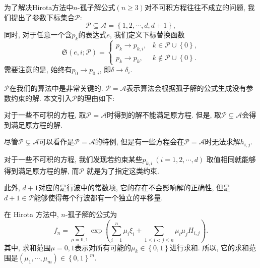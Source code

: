 \documentclass[12pt,a4paper,UTF8]{article}
\numberwithin{equation}{section}
\newcommand{\sbrace}[1]{\left(#1\right)}
\newcommand{\bbrace}[1]{\left\{#1\right\}}
\newcommand{\ALLP}{\mathcal{A}}
\newcommand{\PS}{\mathcal{P}}
\newcommand{\SP}{\mathfrak{S}} %
\begin{document}
为了解决Hirota方法中$n$-孤子解公式$(n\ge 3)$对不可积方程往往不成立的问题, 我们提出了参数下标集合$\PS$: 
\begin{equation}
\PS\subseteq \ALLP=\bbrace{1,2,\cdots,d,d+1} ,
\end{equation}
同时, 对于任意一个含$p_k$的表达式$e$, 我们定义下标替换函数
\begin{equation}
\SP\sbrace{e,i;\PS}=\left\{\begin{array}{ll}
  p_k \to p_{k,i}, & k \in \PS \cup \bbrace{0},\\ 
  p_k \to p_k , & k \not\in\PS \cup \bbrace{0}.
\end{array}\right.
\end{equation}
需要注意的是, 始终有$p_0\to p_{0,i}$, 即$\delta\to \delta_i$. 

$\PS$在我们的算法中是非常关键的. $\PS= \ALLP$表示算法会根据孤子解的公式生成没有参数约束的解. 本文引入$\PS$的理由如下: 
\begin{compactenum}[1. ]
\item 对于一些不可积的方程, 取$\PS= \ALLP$时得到的解不能满足原方程. 但是, 取$\PS\subsetneq  \ALLP$会得到满足原方程的解.
\item 尽管$\PS\subsetneq  \ALLP$可以看作是$\PS= \ALLP$的特例, 但是有一些方程会在$\PS= \ALLP$时无法求解$h_{i,j}$.
\item 对于一些不可积的方程, 我们发现若约束某些$p_{k,i}~(i=1,2,\cdots,d)$ 取值相同就能够得到满足原方程的解, 而$\PS$ 就是为了指定这类约束.
\end{compactenum}

此外, $d+1$对应的是行波中的常数项, 它的存在不会影响解的正确性, 但是$d+1\in \PS$能够使得每个行波都有一个独立的平移量.

在 Hirota 方法中, $n$-孤子解的公式为 
\begin{equation}
f_n=\sum_{\mu=0,1}\exp\sbrace{\sum_{i=1}^n{\mu_i \xi_i}+\sum_{1\le i<j\le n}{\mu_i\mu_jH_{i,j}}}.
\label{soliton-old}
\end{equation}
其中, 求和范围$\mu=0,1$表示对所有可能的$\mu_k\in \bbrace{0,1}$进行求和. 所以, 它的求和范围是$\sbrace{\mu_1,\cdots,\mu_m}\in \bbrace{0,1}^m$.
\end{document}
